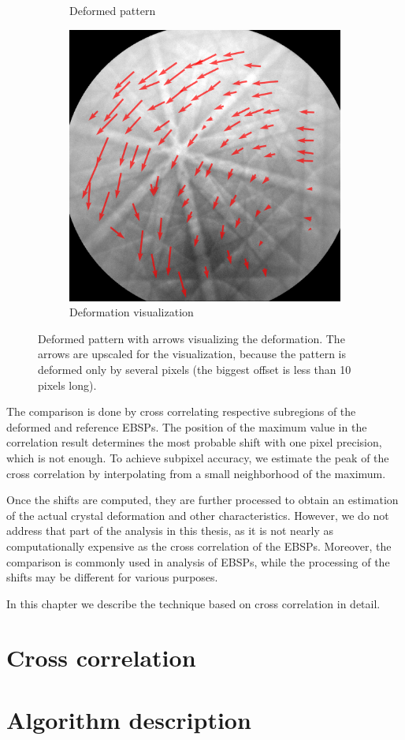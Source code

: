 \begin{figure}
\begin{subfigure}{.5\textwidth}
		\caption{Deformed pattern}
		\label{fig:sub2}
	\end{subfigure}
	\centering
	\begin{subfigure}{.5\textwidth}
		\centering
		\includegraphics[width=.9\linewidth]{img/roi_shifts}
		\caption{Deformation visualization}
		\label{fig:sub2}
	\end{subfigure}

	\caption{Deformed pattern with arrows visualizing the deformation. The arrows are upscaled for the visualization, because the pattern is deformed only by several pixels (the biggest offset is less than 10 pixels long).}
	\label{roi-shifts}
\end{figure}

The comparison is done by cross correlating respective subregions of the deformed and reference EBSPs. The position of the maximum value in the correlation result determines the most probable shift with one pixel precision, which is not enough. To achieve subpixel accuracy, we estimate the peak of the cross correlation by interpolating from a small neighborhood of the maximum.

Once the shifts are computed, they are further processed to obtain an estimation of the actual crystal deformation and other characteristics. However, we do not address that part of the analysis in this thesis, as it is not nearly as computationally expensive as the cross correlation of the EBSPs. Moreover, the comparison is commonly used in analysis of EBSPs, while the processing of the shifts may be different for various purposes.

In this chapter we describe the technique based on cross correlation in detail.

\section{Cross correlation}




\section{Algorithm description}



